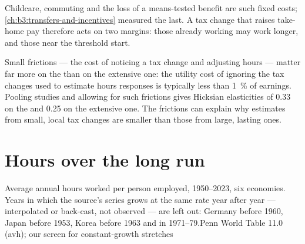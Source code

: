 Childcare, commuting and the loss of a means-tested benefit are such fixed costs;
\cref{ch:b3:transfers-and-incentives} measured the last. A tax change that raises
take-home pay therefore acts on two margins: those already working may work
longer, and those near the threshold start.

\begin{measure}
Small frictions --- the cost of noticing a tax change and adjusting hours --- matter
far more on the  than on the extensive one: the utility cost of
ignoring the tax changes used to estimate hours responses is typically less than
1~\% of earnings. Pooling studies and allowing for such frictions gives Hicksian
elasticities of 0.33 on the  and 0.25 on the extensive one. %
The frictions can explain why estimates from small, local tax changes are smaller
than those from large, lasting ones.
\end{measure}

\section{Hours over the long run}\label{sec:b3:labour-supply-and-demand:hours}

\begin{omchart}{Average annual hours worked per person employed, 1950--2023, six
economies. Years in which the source's series grows at the same rate year after
year --- interpolated or back-cast, not observed --- are left out: Germany before
1960, Japan before 1953, Korea before 1963 and in 1971--79.}{Penn World Table 11.0
(avh); our screen for constant-growth stretches}
\end{omchart}

